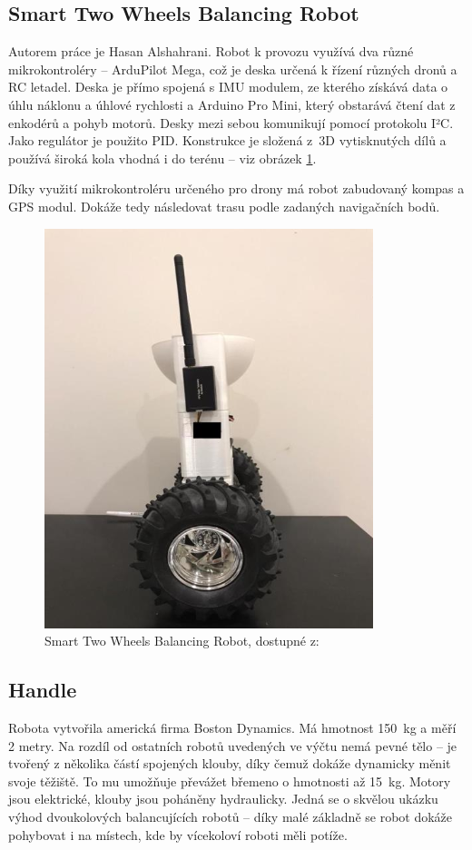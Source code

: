 \subsection*{Smart Two Wheels Balancing Robot}
Autorem práce je Hasan Alshahrani. Robot k provozu využívá dva různé mikrokontroléry -- ArduPilot Mega, což je deska určená k řízení různých dronů a RC letadel. Deska je přímo spojená s IMU modulem, ze kterého získává data o úhlu náklonu a úhlové rychlosti a Arduino Pro Mini, který obstarává čtení dat z enkodérů a pohyb motorů. Desky mezi sebou komunikují pomocí protokolu I²C. Jako regulátor je použito PID. Konstrukce je složená z~3D vytisknutých dílů a používá široká kola vhodná i do terénu -- viz obrázek \ref{SMART_bot}.

Díky využití mikrokontroléru určeného pro drony má robot zabudovaný kompas a GPS modul. Dokáže tedy následovat trasu podle zadaných navigačních bodů. \cite{smart}

\begin{figure}[H]
    \centering
    \includegraphics[width=0.6\linewidth]{obrazky-figures/smart_bot.png}
    \caption{Smart Two Wheels Balancing Robot, dostupné z: \cite{smart}}
    \label{SMART_bot}
\end{figure}

\subsection*{Handle}
Robota vytvořila americká firma Boston Dynamics. Má hmotnost 150~kg a měří 2 metry. Na rozdíl od ostatních robotů uvedených ve výčtu nemá pevné tělo -- je tvořený z několika částí spojených klouby, díky čemuž dokáže dynamicky měnit svoje těžiště. To mu umožňuje převážet břemeno o hmotnosti až 15~kg. Motory jsou elektrické, klouby jsou poháněny hydraulicky. Jedná se o skvělou ukázku výhod dvoukolových balancujících robotů -- díky malé základně se robot dokáže pohybovat i na místech, kde by vícekoloví roboti měli potíže. \cite{handle}

